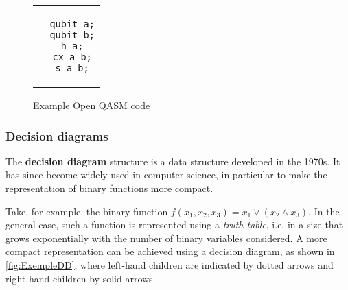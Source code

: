 \begin{figure}[thp]
  \renewcommand{\figurename}{Program}
  \centering
\begin{tabular}{c}
\begin{lstlisting}
  qubit a;
  qubit b;
  h a;
  cx a b;
  s a b;
\end{lstlisting}
\end{tabular}
\caption{Example Open QASM code}
\label{lst:QASM}
\end{figure}

\subsubsection*{Decision diagrams}

The \textbf{decision diagram} structure is a data structure developed in the 1970s. It has since become widely used in computer science, in particular to make the representation of binary functions more compact.

Take, for example, the binary function $f(x_1, x_2, x_3) = x_1 \lor (x_2 \land x_3)$. In the general case, such a function is represented using a \textit{truth table}, i.e. in a size that grows exponentially with the number of binary variables considered. A more compact representation can be achieved using a decision diagram, as shown in \autoref{fig:ExempleDD}, where left-hand children are indicated by dotted arrows and right-hand children by solid arrows.

